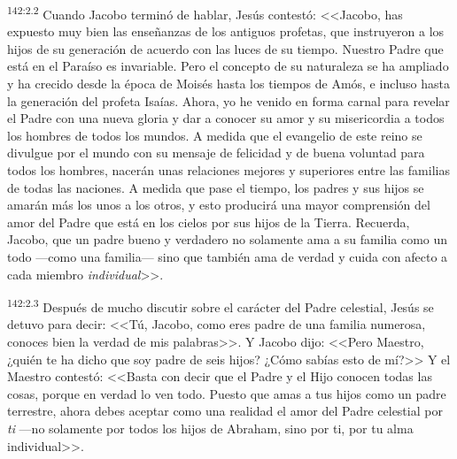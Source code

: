 \par 
\textsuperscript{142:2.2} Cuando Jacobo terminó de hablar, Jesús contestó: <<Jacobo, has expuesto muy bien las enseñanzas de los antiguos profetas, que instruyeron a los hijos de su generación de acuerdo con las luces de su tiempo. Nuestro Padre que está en el Paraíso es invariable. Pero el concepto de su naturaleza se ha ampliado y ha crecido desde la época de Moisés hasta los tiempos de Amós, e incluso hasta la generación del profeta Isaías. Ahora, yo he venido en forma carnal para revelar el Padre con una nueva gloria y dar a conocer su amor y su misericordia a todos los hombres de todos los mundos. A medida que el evangelio de este reino se divulgue por el mundo con su mensaje de felicidad y de buena voluntad para todos los hombres, nacerán unas relaciones mejores y superiores entre las familias de todas las naciones. A medida que pase el tiempo, los padres y sus hijos se amarán más los unos a los otros, y esto producirá una mayor comprensión del amor del Padre que está en los cielos por sus hijos de la Tierra. Recuerda, Jacobo, que un padre bueno y verdadero no solamente ama a su familia como un todo ---como una familia--- sino que también ama de verdad y cuida con afecto a cada miembro \textit{individual}>>.

\par 
\textsuperscript{142:2.3} Después de mucho discutir sobre el carácter del Padre celestial, Jesús se detuvo para decir: <<Tú, Jacobo, como eres padre de una familia numerosa, conoces bien la verdad de mis palabras>>. Y Jacobo dijo: <<Pero Maestro, ¿quién te ha dicho que soy padre de seis hijos? ¿Cómo sabías esto de mí?>> Y el Maestro contestó: <<Basta con decir que el Padre y el Hijo conocen todas las cosas, porque en verdad lo ven todo. Puesto que amas a tus hijos como un padre terrestre, ahora debes aceptar como una realidad el amor del Padre celestial por \textit{ti} ---no solamente por todos los hijos de Abraham, sino por ti, por tu alma individual>>.

